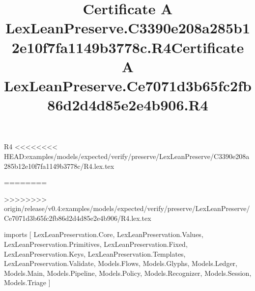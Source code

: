 \begin{lexlean}{R4}
<<<<<<<< HEAD:examples/models/expected/verify/preserve/LexLeanPreserve/C3390e208a285b12e10f7fa1149b3778c/R4.lex.tex
\title{Certificate A LexLeanPreserve.C3390e208a285b12e10f7fa1149b3778c.R4}
========
\title{Certificate A LexLeanPreserve.Ce7071d3b65fc2fb86d2d4d85e2e4b906.R4}
>>>>>>>> origin/release/v0.4:examples/models/expected/verify/preserve/LexLeanPreserve/Ce7071d3b65fc2fb86d2d4d85e2e4b906/R4.lex.tex
\begin{coremodule}
imports [
  LexLeanPreservation.Core,
  LexLeanPreservation.Values,
  LexLeanPreservation.Primitives,
  LexLeanPreservation.Fixed,
  LexLeanPreservation.Keys,
  LexLeanPreservation.Templates,
  LexLeanPreservation.Validate,
  Models.Flows,
  Models.Glyphs,
  Models.Ledger,
  Models.Main,
  Models.Pipeline,
  Models.Policy,
  Models.Recognizer,
  Models.Session,
  Models.Triage
]


\end{coremodule}
\end{lexlean}
